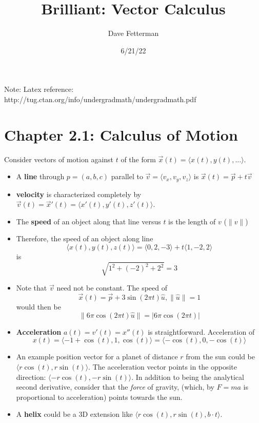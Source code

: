 \documentclass[11pt, oneside]{article}   	%
\title{Brilliant: Vector Calculus}
\author{Dave Fetterman}
\date{6/21/22}							%
\begin{document}
\maketitle
Note: Latex reference: http://tug.ctan.org/info/undergradmath/undergradmath.pdf
\section{Chapter 2.1: Calculus of Motion}

Consider vectors of motion against $t$ of the form $ \overrightarrow{x}(t) = \langle x(t), y(t), \ldots \rangle$.
\begin{itemize}
\item A \textbf{line} through $p = (a, b, c)$ parallel to $\overrightarrow{v} = \langle v_x, v_y, v_z\rangle$ is $\overrightarrow{x}(t) = \overrightarrow{p} + t \overrightarrow{v}$ 
\item \textbf{velocity} is characterized completely by $\overrightarrow{v}(t) = \overrightarrow{x}'(t) = \langle x'(t), y'(t), z'(t)\rangle$.
\item The \textbf{speed} of an object along that line versus $t$ is the length of $v$ ($\|v\|$)  
\item Therefore, the speed of an object along line 
$$ \langle x(t), y(t), z(t)\rangle = \langle 0, 2, -3\rangle + t\langle 1,-2,2\rangle$$ is $$\sqrt{1^2+(-2)^2 + 2^2} = 3$$
\item Note that $\overrightarrow{v}$ need not be constant.  The speed of $$\overrightarrow{x}(t) =  \overrightarrow{p} + 3 \sin(2\pi t)\hat{u}, \| \hat{u} \| = 1$$ would then be $$\| 6\pi \cos(2 \pi t) \hat{u} \| = |6\pi \cos(2 \pi t)|$$
\item \textbf{Acceleration} $a(t) = v'(t) = x''(t)$ is straightforward.  Acceleration of $$x(t) = \langle -1 + \cos(t), 1, \cos(t)\rangle = \langle -\cos(t), 0, -\cos(t)\rangle$$
\item An example position vector for a planet of distance $r$ from the sun could be $\langle r \cos(t), r \sin(t) \rangle$.  The acceleration vector points in the opposite direction: $\langle - r \cos(t), - r \sin(t) \rangle$.  In addition to being the analytical second derivative, consider that the \emph{force} of gravity, (which, by $F = ma$ is proportional to acceleration) points towards the sun.  
\item A \textbf{helix} could be a 3D extension like $\langle r \cos(t), r \sin(t), b\cdot t \rangle$.  
\end{itemize}
\end{document}
